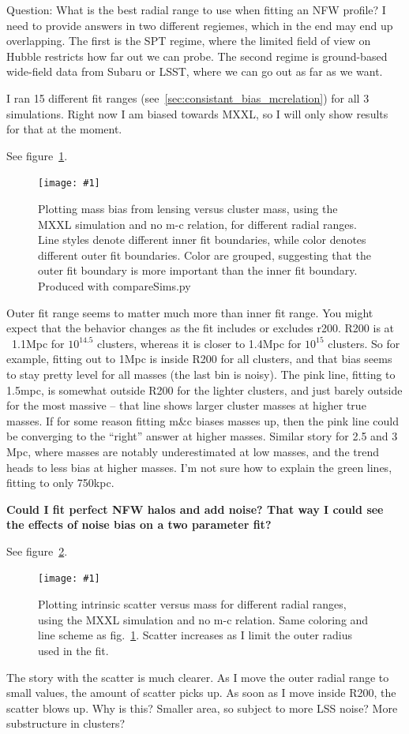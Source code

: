 \documentclass[11pt]{article}
\newcommand{\logfig}[2]{
See figure~\ref{fig:#1}.
\begin{figure}[!ht] 
\texttt{[image: \#1]} 
\caption{#2} 
\label{fig:#1} 
\end{figure}
}
\begin{document}
Question: What is the best radial range to use when fitting an NFW profile? I need to provide answers in two different regiemes, which in the end may end up overlapping. The first is the SPT regime, where the limited field of view on Hubble restricts how far out we can probe. The second regime is ground-based wide-field data from Subaru or LSST, where we can go out as far as we want.

I ran 15 different fit ranges (see~\ref{sec:consistant_bias_mcrelation}) for all 3 simulations. Right now I am biased towards MXXL, so I will only show results for that at the moment.

\logfig{figures/cfree}{Plotting mass bias from lensing versus cluster mass, using the MXXL simulation and no m-c relation, for different radial ranges. Line styles denote different inner fit boundaries, while color denotes different outer fit boundaries. Color are grouped, suggesting that the outer fit boundary is more important than the inner fit boundary. Produced with compareSims.py}

Outer fit range seems to matter much more than inner fit range. You might expect that the behavior changes as the fit includes or excludes r200. R200 is at ~1.1Mpc for $10^{14.5}$ clusters, whereas it is closer to 1.4Mpc for $10^{15}$ clusters. So for example, fitting out to 1Mpc is inside R200 for all clusters, and that bias seems to stay pretty level for all masses (the last bin is noisy). The pink line, fitting to 1.5mpc, is somewhat outside R200 for the lighter clusters, and just barely outside for the most massive -- that line shows larger cluster masses at higher true masses. If for some reason fitting m\&c biases masses up, then the pink line could be converging to the ``right'' answer at higher masses. Similar story for 2.5 and 3 Mpc, where masses are notably underestimated at low masses, and the trend heads to less bias at higher masses. I'm not sure how to explain the green lines, fitting to only 750kpc. 


\textbf{Could I fit perfect NFW halos and add noise? That way I could see the effects of noise bias on a two parameter fit?}


\logfig{figures/cfree_scatter}{Plotting intrinsic scatter versus mass for different radial ranges, using the MXXL simulation and no m-c relation. Same coloring and line scheme as fig.~\ref{fig:figures/cfree}. Scatter increases as I limit the outer radius used in the fit.}

The story with the scatter is much clearer. As I move the outer radial range to small values, the amount of scatter picks up. As soon as I move inside R200, the scatter blows up. Why is this? Smaller area, so subject to more LSS noise? More substructure in clusters?
\end{document}
